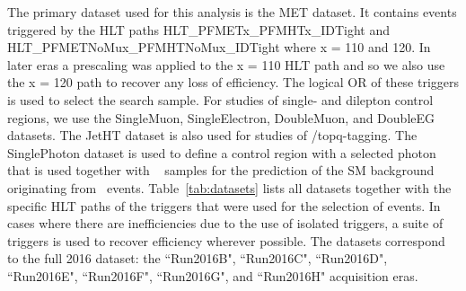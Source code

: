 \label{sec:samples}
The primary dataset used for this analysis is the MET dataset.
It contains events triggered by the HLT paths HLT\_PFMETx\_PFMHTx\_IDTight and HLT\_PFMETNoMux\_PFMHTNoMux\_IDTight where x = 110 and 120. In later eras a prescaling was applied to the x = 110 HLT path and so we also use the x = 120 path to recover any loss of efficiency. The logical OR of these triggers is used to select the search sample. 
 For studies of single- and dilepton control regions, we use the SingleMuon, SingleElectron, DoubleMuon, and DoubleEG datasets. The JetHT dataset is also used for studies of \W/topq-tagging. The SinglePhoton dataset is used to define a control region with a selected photon that is used together with \Zll~  samples for the prediction of the SM background originating from \Znunu~events. Table~\ref{tab:datasets} lists all datasets together with the specific HLT paths of the triggers that were used for the selection of events. In cases where there are inefficiencies due to the use of isolated triggers, a suite of triggers is used to recover efficiency wherever possible. The datasets correspond to the full 2016 dataset: the ``Run2016B", ``Run2016C", ``Run2016D", ``Run2016E", ``Run2016F", ``Run2016G", and ``Run2016H" acquisition eras.

